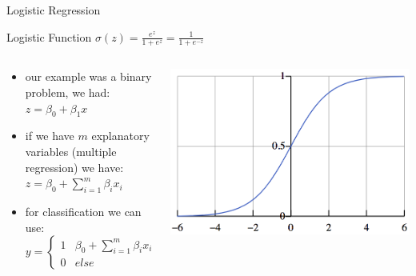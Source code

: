 \documentclass{beamer}
\begin{document}
\begin{frame}{Logistic Regression}

\begin{block}{Logistic Function}
$\sigma(z) = \frac{e^z}{1+e^z} = \frac{1}{1+e^{-z}}$ 
\end{block}



\begin{columns}

\begin{column}{0.7\textwidth}
\begin{itemize}
\item our example was a binary problem, we had:\\ 
$z=\beta_0+ \beta_1x$
\item if we have $m$ explanatory variables (multiple regression) we have:\\ 
$z=\beta_0 + \sum_{i=1}^{m} \beta_i x_i$
\item for classification we can use:
$$
y=
\begin{cases}
1 & \beta_0 + \sum_{i=1}^{m} \beta_i x_i > 0\\
0 & else
\end{cases}
$$


\end{itemize}
\end{column}

\begin{column}{0.3\textwidth}
	\includegraphics[width=1.1\textwidth]{logisticfunc}
\end{column}
\end{columns}
\end{frame}
\end{document}
